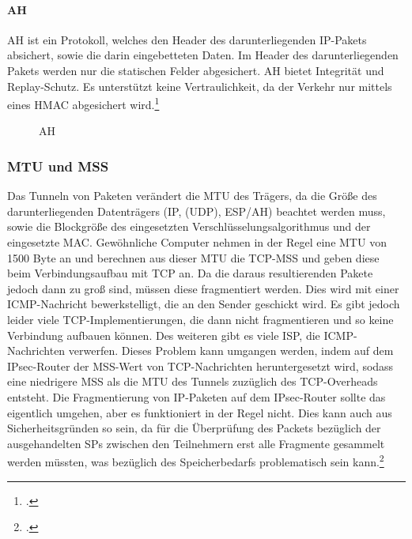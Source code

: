 \paragraph{AH}
\ac{AH} ist ein Protokoll, welches den Header des darunterliegenden \ac{IP}-Pakets absichert,
sowie die darin eingebetteten Daten. Im Header des darunterliegenden Pakets werden nur die statischen Felder
abgesichert. \ac{AH} bietet Integrität und Replay-Schutz. Es unterstützt keine Vertraulichkeit, da
der Verkehr nur mittels eines \ac{HMAC} abgesichert wird.\footcite[][]{stephen_kent_rfc_2005-1}
\begin{figure}[h!]
    \label{fig:AH}
    \centering
    \def\svgwidth{\columnwidth}
    
    \caption{\ac{AH}}
\end{figure}

\subsubsection{MTU und MSS}

Das Tunneln von Paketen verändert die \ac{MTU} des Trägers, da die Größe des darunterliegenden
Datenträgers (IP, (UDP), ESP/AH) beachtet werden muss, sowie die Blockgröße
des eingesetzten Verschlüsselungsalgorithmus und der eingesetzte \ac{MAC}.
Gewöhnliche Computer nehmen in der Regel eine \ac{MTU} von 1500 Byte an und 
berechnen aus dieser \ac{MTU} die TCP-\ac{MSS} und geben diese beim Verbindungsaufbau mit \ac{TCP}
an. Da die daraus resultierenden Pakete jedoch dann zu groß sind, müssen diese fragmentiert werden.
Dies wird mit einer \ac{ICMP}-Nachricht bewerkstelligt, die an den Sender geschickt wird.
Es gibt jedoch leider viele \ac{TCP}-Implementierungen, die dann nicht fragmentieren und so
keine Verbindung aufbauen können. Des weiteren gibt es viele \ac{ISP}, die ICMP-Nachrichten
verwerfen. Dieses Problem kann umgangen werden, indem auf dem \ac{IPsec}-Router
der \ac{MSS}-Wert von \ac{TCP}-Nachrichten heruntergesetzt wird, sodass eine niedrigere
\ac{MSS} als die \ac{MTU} des Tunnels zuzüglich des \ac{TCP}-Overheads entsteht.
Die Fragmentierung von \ac{IP}-Paketen auf dem \ac{IPsec}-Router sollte das eigentlich umgehen,
aber es funktioniert in der Regel nicht. Dies kann auch aus Sicherheitsgründen so sein,
da für die Überprüfung des Packets bezüglich der ausgehandelten \acp{SP} zwischen den Teilnehmern
erst alle Fragmente gesammelt werden müssten, was bezüglich des Speicherbedarfs problematisch sein kann.\footcite[][Kapitel 3.4 Inbound Packet Processing]{stephen_kent_rfc_2005-2}


